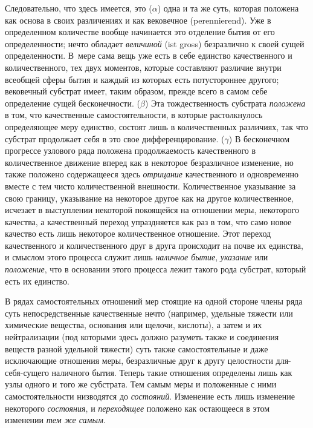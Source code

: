 Следовательно, что здесь имеется, это ($\alpha $)
одна и та же суть, которая положена как основа в своих различениях и как
вековечное (perennierend). Уже в определенном количестве вообще начинается
это отделение бытия от его определенности; нечто обладает
{\em величиной} (ist gross) безразлично к своей сущей
определенности. В~мере сама вещь уже есть в себе единство качественного и
количественного, тех двух моментов, которые составляют различие внутри
всеобщей сферы бытия и каждый из которых есть потустороннее другого;
вековечный субстрат имеет, таким образом, прежде всего в самом себе
определение сущей бесконечности. ($\beta $) Эта
тождественность субстрата {\em положена} в том, что
качественные самостоятельности, в которые растолкнулось определяющее меру
единство, состоят лишь в количественных различиях, так что субстрат
продолжает себя в это свое дифференцирование.
($\gamma $) В бесконечном прогрессе узлового ряда
положена продолжаемость качественного в количественное движение вперед как
в некоторое безразличное изменение, но также положено содержащееся здесь
{\em отрицание} качественного и одновременно вместе с
тем чисто количественной внешности. Количественное указывание за свою
границу, указывание на некоторое другое как на другое количественное,
исчезает в выступлении некоторой покоящейся на отношении меры, некоторого
качества, а качественный переход упраздняется как раз в том, что само новое
качество есть лишь некоторое количественное отношение. Этот переход
качественного и количественного друг в друга происходит на почве их
единства, и смыслом этого процесса служит лишь
{\em наличное бытие},
{\em указание} или {\em положение},
что в основании этого процесса лежит такого рода субстрат, который есть их
единство.

В рядах самостоятельных отношений мер стоящие на одной стороне члены ряда
суть непосредственные качественные нечто (например, удельные тяжести или
химические вещества, основания или щелочи, кислоты), а затем и их
нейтрализации (под которыми здесь должно разуметь также и соединения
веществ разной удельной тяжести) суть также самостоятельные и даже
исключающие отношения меры, безразличные друг к другу целостности
для-себя-сущего наличного бытия. Теперь такие отношения определены лишь как
узлы одного и того же субстрата. Тем самым меры и положенные с ними
самостоятельности низводятся до {\em состояний}.
Изменение есть лишь изменение некоторого
{\em состояния}, и
{\em переходящее} положено как остающееся в этом
изменении {\em тем же самым}.

